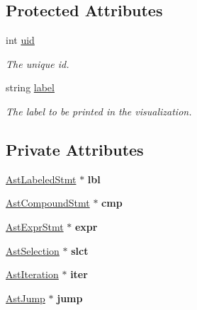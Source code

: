 \subsection*{Protected Attributes}
\begin{DoxyCompactItemize}
\item 
\hypertarget{classAST_a847b778f1c3dd5a19de32de432ee6e15}{int \hyperlink{classAST_a847b778f1c3dd5a19de32de432ee6e15}{uid}}\label{classAST_a847b778f1c3dd5a19de32de432ee6e15}

\begin{DoxyCompactList}\small\item\em The unique id. \end{DoxyCompactList}\item 
\hypertarget{classAST_ab2e239ccc0688d2341724432ff5a1a31}{string \hyperlink{classAST_ab2e239ccc0688d2341724432ff5a1a31}{label}}\label{classAST_ab2e239ccc0688d2341724432ff5a1a31}

\begin{DoxyCompactList}\small\item\em The label to be printed in the visualization. \end{DoxyCompactList}\end{DoxyCompactItemize}
\subsection*{Private Attributes}
\begin{DoxyCompactItemize}
\item 
\hypertarget{classAstStatement_a959cdc8445704afd0743323ff1187864}{\hyperlink{classAstLabeledStmt}{Ast\-Labeled\-Stmt} $\ast$ {\bfseries lbl}}\label{classAstStatement_a959cdc8445704afd0743323ff1187864}

\item 
\hypertarget{classAstStatement_abe55f8a5598959cbfc98905a3c7f3c61}{\hyperlink{classAstCompoundStmt}{Ast\-Compound\-Stmt} $\ast$ {\bfseries cmp}}\label{classAstStatement_abe55f8a5598959cbfc98905a3c7f3c61}

\item 
\hypertarget{classAstStatement_a233bc02d0b2ea3cceae7b483644a7be8}{\hyperlink{classAstExprStmt}{Ast\-Expr\-Stmt} $\ast$ {\bfseries expr}}\label{classAstStatement_a233bc02d0b2ea3cceae7b483644a7be8}

\item 
\hypertarget{classAstStatement_a38f48fb1951a4e4aef699e20d620220d}{\hyperlink{classAstSelection}{Ast\-Selection} $\ast$ {\bfseries slct}}\label{classAstStatement_a38f48fb1951a4e4aef699e20d620220d}

\item 
\hypertarget{classAstStatement_a7a48aafdfcb5e6d36608d0c751a146bf}{\hyperlink{classAstIteration}{Ast\-Iteration} $\ast$ {\bfseries iter}}\label{classAstStatement_a7a48aafdfcb5e6d36608d0c751a146bf}

\item 
\hypertarget{classAstStatement_adce7399aacd5d715c3c527de0caf78bf}{\hyperlink{classAstJump}{Ast\-Jump} $\ast$ {\bfseries jump}}\label{classAstStatement_adce7399aacd5d715c3c527de0caf78bf}

\end{DoxyCompactItemize}


